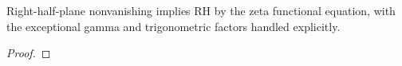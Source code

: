 \begin{theorem}
\label{right}
\leanok
Right-half-plane nonvanishing implies RH by the zeta functional equation, with the exceptional gamma and trigonometric factors handled explicitly.
\end{theorem}
\begin{proof}
\leanok
\end{proof}
